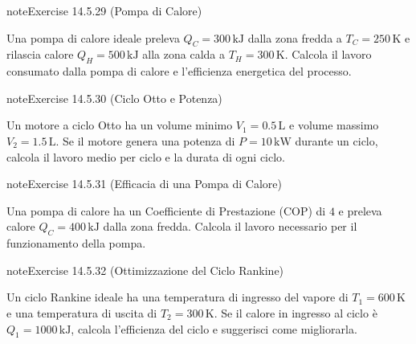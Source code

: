 \documentclass[letterpaper,10pt,italian]{jupyterBook}
\begin{document}
\begin{sphinxadmonition}{note}{Exercise 14.5.29 (Pompa di Calore)}



\sphinxAtStartPar
Una pompa di calore ideale preleva \(Q_C = 300 \, \text{kJ}\) dalla zona fredda a \(T_C = 250 \, \text{K}\) e rilascia calore \(Q_H = 500 \, \text{kJ}\) alla zona calda a \(T_H = 300 \, \text{K}\). Calcola il lavoro consumato dalla pompa di calore e l’efficienza energetica del processo.
\end{sphinxadmonition}
 \label{exercise:ch/thermodynamics/heat-engine-problems-exercise-29}

\begin{sphinxadmonition}{note}{Exercise 14.5.30 (Ciclo Otto e Potenza)}



\sphinxAtStartPar
Un motore a ciclo Otto ha un volume minimo \(V_1 = 0.5 \, \text{L}\) e volume massimo \(V_2 = 1.5 \, \text{L}\). Se il motore genera una potenza di \(P = 10 \, \text{kW}\) durante un ciclo, calcola il lavoro medio per ciclo e la durata di ogni ciclo.
\end{sphinxadmonition}
 \label{exercise:ch/thermodynamics/heat-engine-problems-exercise-30}

\begin{sphinxadmonition}{note}{Exercise 14.5.31 (Efficacia di una Pompa di Calore)}



\sphinxAtStartPar
Una pompa di calore ha un Coefficiente di Prestazione (COP) di \(4\) e preleva calore \(Q_C = 400 \, \text{kJ}\) dalla zona fredda. Calcola il lavoro necessario per il funzionamento della pompa.
\end{sphinxadmonition}
 \label{exercise:ch/thermodynamics/heat-engine-problems-exercise-31}

\begin{sphinxadmonition}{note}{Exercise 14.5.32 (Ottimizzazione del Ciclo Rankine)}



\sphinxAtStartPar
Un ciclo Rankine ideale ha una temperatura di ingresso del vapore di \(T_1 = 600 \, \text{K}\) e una temperatura di uscita di \(T_2 = 300 \, \text{K}\). Se il calore in ingresso al ciclo è \(Q_1 = 1000 \, \text{kJ}\), calcola l’efficienza del ciclo e suggerisci come migliorarla.
\end{sphinxadmonition}
 \label{exercise:ch/thermodynamics/heat-engine-problems-exercise-32}
\end{document}
